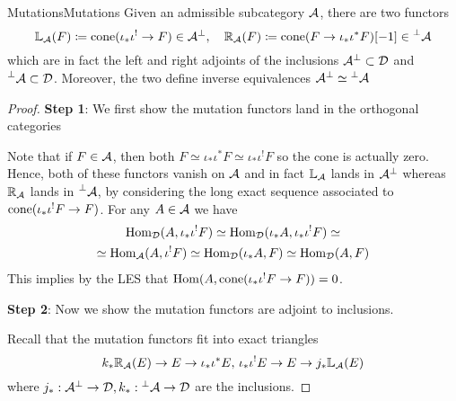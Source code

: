 \begin{definition}{Mutations}{Mutations}
    Given an admissible subcategory $\mathcal{A}$, there are two functors
    \begin{equation*}
        \mathbb{L}_{\mathcal{A}}(F) \coloneqq \operatorname{cone}(\iota_*\iota^!\to F)\in \mathcal{A}^\perp, \quad
        \mathbb{R}_{\mathcal{A}}(F) \coloneqq \operatorname{cone}(F\to \iota_*\iota^* F )[-1]\in \prescript{\perp}{}{\mathcal{A}}
    \end{equation*}
    which are in fact the left and right adjoints of the inclusions $\mathcal{A}^\perp \subset\mathcal{D}$ and $\prescript{\perp}{}{\mathcal{A}}\subset\mathcal{D}$. Moreover, the two define inverse equivalences $\mathcal{A}^\perp \simeq \prescript{\perp}{}{}\mathcal{A}$
\end{definition}

\begin{proof}
    \textbf{Step 1}: We first show the mutation functors land in the orthogonal categories

    Note that if $F\in \mathcal{A}$, then both $F\simeq \iota_*\iota^* F \simeq \iota_*\iota^! F$ so the cone is actually zero. Hence, both of these functors vanish on $\mathcal{A}$ and in fact $\mathbb{L}_{\mathcal{A}}$ lands in $\mathcal{A}^\perp$ whereas $\mathbb{R}_{\mathcal{A}}$ lands in $\prescript{\perp}{}{\mathcal{A}}$, by considering the long exact sequence associated to $\operatorname{cone}(\iota_*\iota^!F\to F)$. For any $A\in \mathcal{A}$ we have
    \begin{gather*}
        \operatorname{Hom}_{\mathcal{D}}(A, \iota_*\iota^!F)
            \simeq \operatorname{Hom}_{\mathcal{D}}(\iota_* A, \iota_*\iota^!F)\simeq \\
            \simeq \operatorname{Hom}_{\mathcal{A}}(A, \iota^!F)\simeq \operatorname{Hom}_{\mathcal{D}}(\iota_* A, F)
            \simeq \operatorname{Hom}_{\mathcal{D}}(A, F)
    \end{gather*}
    This implies by the LES that $\operatorname{Hom}(A,\operatorname{cone}(\iota_*\iota^!F\to F))=0$.

    \textbf{Step 2}: Now we show the mutation functors are adjoint to inclusions.

    Recall that the mutation functors fit into exact triangles $$k_*\mathbb{R}_{\mathcal{A}} (E)\rightarrow E \rightarrow \iota_* \iota^* E,\, \iota_* \iota^! E \rightarrow E \rightarrow j_*\mathbb{L}_{\mathcal{A}}(E)$$
    where $j_*: \mathcal{A}^\perp \rightarrow\mathcal{D}, k_*: \prescript{\perp}{}{}\mathcal{A}\rightarrow\mathcal{D}$ are the inclusions.



\end{proof}
